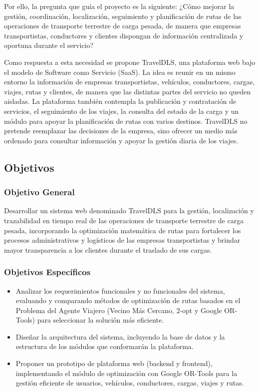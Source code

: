 Por ello, la pregunta que guía el proyecto es la siguiente: ¿Cómo mejorar la gestión, coordinación, localización, seguimiento y planificación de rutas de las operaciones de transporte terrestre de carga pesada, de manera que empresas transportistas, conductores y clientes dispongan de información centralizada y oportuna durante el servicio?

Como respuesta a esta necesidad se propone TravelDLS, una plataforma web bajo el modelo de Software como Servicio (SaaS). La idea es reunir en un mismo entorno la información de empresas transportistas, vehículos, conductores, cargas, viajes, rutas y clientes, de manera que las distintas partes del servicio no queden aisladas. La plataforma también contempla la publicación y contratación de servicios, el seguimiento de los viajes, la consulta del estado de la carga y un módulo para apoyar la planificación de rutas con varios destinos. TravelDLS no pretende reemplazar las decisiones de la empresa, sino ofrecer un medio más ordenado para consultar información y apoyar la gestión diaria de los viajes.

\subsection{Objetivos}
\label{sec:objetivos}

\subsubsection{Objetivo General}
 Desarrollar un sistema web denominado TravelDLS para la gestión, localización y trazabilidad en tiempo real de las operaciones de transporte terrestre de carga pesada, incorporando la optimización matemática de rutas para fortalecer los procesos administrativos y logísticos de las empresas transportistas y brindar mayor transparencia a los clientes durante el traslado de sus cargas.

\subsubsection{Objetivos Específicos}
\label{sec:objetivos-especificos}
\begin{itemize}
	\item Analizar los requerimientos funcionales y no funcionales del sistema, evaluando y comparando métodos de optimización de rutas basados en el Problema del Agente Viajero (Vecino Más Cercano, 2-opt y Google OR-Tools) para seleccionar la solución más eficiente.
	\item Diseñar la arquitectura del sistema, incluyendo la base de datos y la estructura de los módulos que conformarán la plataforma.
	\item Proponer un prototipo de plataforma web (backend y frontend), implementando el módulo de optimización con Google OR-Tools para la gestión eficiente de usuarios, vehículos, conductores, cargas, viajes y rutas.
\end{itemize}

